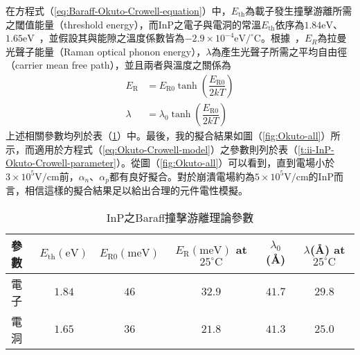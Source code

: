 在方程式（\ref{eq:Baraff-Okuto-Crowell-equation}）中，$E_\text{th}$為載子發生撞擊游離所需之閾值能量（threshold energy），而InP之電子與電洞的常溫$E_\text{th}$依序為$1.84\left.\mathrm{eV}\right.$、$1.65\left.\mathrm{eV}\right.$~\cite{pearsall1979threshold}，並假設其與能隙之溫度係數皆為$-2.9\times10^{-4}\left.\mathrm{eV}/^\circ\mathrm{C}\right.$\cite{turner1964radiative}。根據~\cite{crowell1966temperature}，$E_R$為拉曼光聲子能量（Raman optical phonon energy），$\lambda$為產生光聲子所需之平均自由徑（carrier mean free path），並且兩者與溫度之關係為
\begin{equation}
\begin{aligned}
E_\text{R}&=E_\text{R0}\tanh\left(\dfrac{E_\text{R0}}{2kT}\right)\\[5pt]
\lambda&=\lambda_0\tanh\left(\dfrac{E_\text{R0}}{2kT}\right)
\end{aligned}
\end{equation}
上述相關參數均列於表（\ref{t:ii-InP-Baraff-parameter}）中。最後，我的擬合結果如圖（\ref{fig:Okuto-all}）所示，而適用於方程式（\ref{eq:Okuto-Crowell-model}）之參數則列於表（\ref{t:ii-InP-Okuto-Crowell-parameter}）。從圖（\ref{fig:Okuto-all}）可以看到，直到電場小於$3\times10^5\left.\mathrm{V}/\mathrm{cm}\right.$前，$\alpha_n$、$\alpha_p$都有良好擬合。對於崩潰電場約為$5\times10^5\left.\mathrm{V}/\mathrm{cm}\right.$的InP而言，相信這樣的擬合結果足以給出合理的元件電性模擬。
\begin{table}[h]
\begin{center}
\caption[InP之Baraff撞擊游離理論參數]{InP之Baraff撞擊游離理論參數\cite{taguchi1986temperature}} \label{t:ii-InP-Baraff-parameter}
\begin{tabular}{lccccc}
\hline
 參數 &	$E_\text{th}(\mathrm{eV})$	&	$E_\text{R0}(\mathrm{meV})$		&	$E_\text{R}(\mathrm{meV})$ at $25^\circ\mathrm{C}$	&	$\lambda_0$(\AA)	&	$\lambda$(\AA) at $25^\circ\mathrm{C}$\\
\hline
電子	&	$1.84$	&	$46$	&	$32.9$	&	$41.7$	&	$29.8$\\
電洞	&	$1.65$	&	$36$	&	$21.8$	&	$41.3$	&	$25.0$\\
\hline
\end{tabular}
\end{center}
\end{table}
